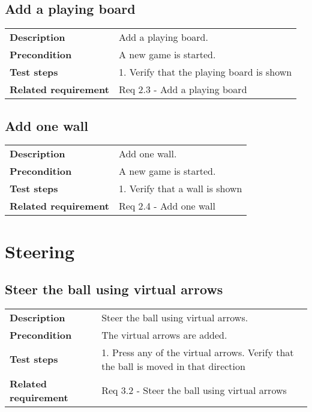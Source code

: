\documentclass[a4paper,titlepage]{article}
\begin{document}
\subsection{Add a playing board}
\begin{tabularx}{\textwidth}{lX}
	\textbf{Description}	&
		Add a playing board.\\
	\textbf{Precondition}	&
		A new game is started.\\
	\textbf{Test steps}	&
		1.  Verify that the playing board is shown\\
	\textbf{Related requirement}	&
		Req 2.3 - Add a playing board \\
\end{tabularx}

\subsection{Add one wall}
\begin{tabularx}{\textwidth}{lX}
	\textbf{Description}	&
		Add one wall.\\
	\textbf{Precondition}	&
		A new game is started.\\
	\textbf{Test steps}	&
		1.  Verify that a wall is shown\\
	\textbf{Related requirement}	&
		Req 2.4 - Add one wall \\
\end{tabularx}


\newpage
\section{Steering}
\subsection{Steer the ball using virtual arrows}
\begin{tabularx}{\textwidth}{lX}
	\textbf{Description}	&
		Steer the ball using virtual arrows.\\
	\textbf{Precondition}	&
		The virtual arrows are added.\\
	\textbf{Test steps}	&
		1.  Press any of the virtual arrows\newline
		2.  Verify that the ball is moved in that direction\\
	\textbf{Related requirement}	&
		Req 3.2 - Steer the ball using virtual arrows \\
\end{tabularx}

\newpage
\end{document}
